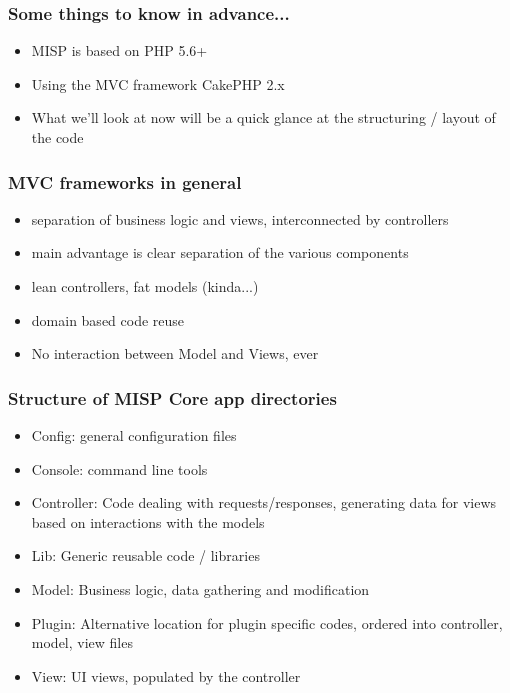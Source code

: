 
\begin{frame}
\titlepage
\end{frame}

\begin{frame}
  \frametitle{Some things to know in advance...}
  \begin{itemize}
    \item MISP is based on PHP 5.6+
    \item Using the MVC framework CakePHP 2.x
    \item What we'll look at now will be a quick glance at the structuring / layout of the code
  \end{itemize}
\end{frame}

\begin{frame}
  \frametitle{MVC frameworks in general}
  \begin{itemize}
    \item separation of business logic and views, interconnected by controllers
    \item main advantage is clear separation of the various components
    \item lean controllers, fat models (kinda...)
    \item domain based code reuse
    \item No interaction between Model and Views, ever
  \end{itemize}
\end{frame}

\begin{frame}
  \frametitle{Structure of MISP Core app directories}
  \begin{itemize}
    \item Config: general configuration files
    \item Console: command line tools
    \item Controller: Code dealing with requests/responses, generating data for views based on interactions with the models
    \item Lib: Generic reusable code / libraries
    \item Model: Business logic, data gathering and modification
    \item Plugin: Alternative location for plugin specific codes, ordered into controller, model, view files
    \item View: UI views, populated by the controller
  \end{itemize}
\end{frame}

